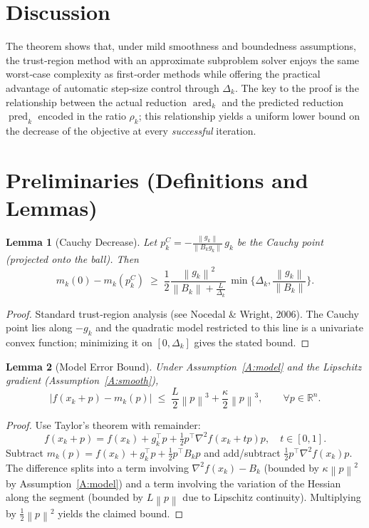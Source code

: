 \documentclass{article}
\newtheorem{lemma}{Lemma}
\newcommand{\norm}[1]{\left\lVert #1\right\rVert}
\newcommand{\R}{\mathbb{R}}
\begin{document}
\section*{Discussion}
The theorem shows that, under mild smoothness and boundedness assumptions, the trust‑region method with an approximate subproblem solver enjoys the same worst‑case complexity as first‑order methods while offering the practical advantage of automatic step‑size control through $\Delta_{k}$.  The key to the proof is the relationship between the actual reduction $\operatorname{ared}_{k}$ and the predicted reduction $\operatorname{pred}_{k}$ encoded in the ratio $\rho_{k}$; this relationship yields a uniform lower bound on the decrease of the objective at every \emph{successful} iteration.

\newpage
\section*{Preliminaries (Definitions and Lemmas)}
\begin{lemma}[Cauchy Decrease]\label{lem:cauchy}
Let $p_{k}^{C}= -\frac{\norm{g_{k}}}{\norm{B_{k}g_{k}}}\,g_{k}$ be the Cauchy point (projected onto the ball). Then
\[
m_{k}(0)-m_{k}(p_{k}^{C})\;\ge\;\frac12\frac{\norm{g_{k}}^{2}}{\norm{B_{k}}+\frac{L}{\Delta_{k}}}\,\min\{\Delta_{k},\frac{\norm{g_{k}}}{\norm{B_{k}}}\}.
\]
\end{lemma}
\begin{proof}
Standard trust‑region analysis (see Nocedal \& Wright, 2006).  The Cauchy point lies along $-g_{k}$ and the quadratic model restricted to this line is a univariate convex function; minimizing it on $[0,\Delta_{k}]$ gives the stated bound.  \qedhere
\end{proof}

\begin{lemma}[Model Error Bound]\label{lem:modelerror}
Under Assumption~\ref{A:model} and the Lipschitz gradient (Assumption~\ref{A:smooth}),
\[
\bigl|f(x_{k}+p)-m_{k}(p)\bigr|\;\le\;\frac{L}{2}\norm{p}^{3}+\frac{\kappa}{2}\norm{p}^{3},\qquad\forall p\in\R^{n}.
\]
\end{lemma}
\begin{proof}
Use Taylor’s theorem with remainder:
\[
f(x_{k}+p)=f(x_{k})+g_{k}^{\top}p+\tfrac12p^{\top}\nabla^{2}f(x_{k}+tp)p,\quad t\in[0,1].
\]
Subtract $m_{k}(p)=f(x_{k})+g_{k}^{\top}p+\tfrac12p^{\top}B_{k}p$ and add/subtract $\tfrac12p^{\top}\nabla^{2}f(x_{k})p$.
The difference splits into a term involving $\nabla^{2}f(x_{k})-B_{k}$ (bounded by $\kappa\norm{p}^{2}$ by Assumption~\ref{A:model}) and a term involving the variation of the Hessian along the segment (bounded by $L\norm{p}$ due to Lipschitz continuity). Multiplying by $\tfrac12\norm{p}^{2}$ yields the claimed bound. \qedhere
\end{proof}
\end{document}
